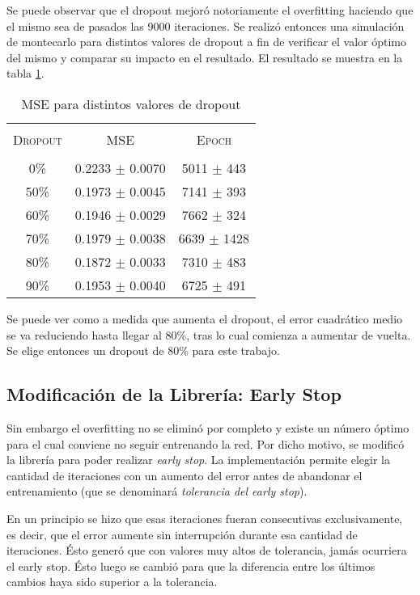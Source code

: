 \documentclass[conference]{IEEEtran}
\theoremstyle{definition}
\begin{document}
Se puede observar que el dropout mejor\'{o} notoriamente el overfitting haciendo que el mismo sea de pasados las 9000 iteraciones. Se realiz\'{o} entonces una simulaci\'{o}n de montecarlo para distintos valores de dropout a fin de verificar el valor \'{o}ptimo del mismo y comparar su impacto en el resultado. El resultado se muestra en la tabla \ref{tab_dropout_montecarlo}.

\begin{table}[h]
	\centering
	\caption{MSE para distintos valores de dropout}
	\label{tab_dropout_montecarlo}
	\begin{tabular}{ c c c }    
		\hline \\ 
		\textsc{Dropout} & \textsc{MSE} & \textsc{Epoch}    \\ 
		\hline 
		\\
		0\%		&  0.2233 \(\pm\) 0.0070 	& 5011 \(\pm\) 443 	\\
		50\% 	&  0.1973 \(\pm\) 0.0045 	& 7141 \(\pm\) 393 	\\
		60\%  	&  0.1946 \(\pm\) 0.0029 	& 7662 \(\pm\) 324	\\
		70\% 	&  0.1979 \(\pm\) 0.0038 	& 6639 \(\pm\) 1428 \\
		80\%  	&  0.1872 \(\pm\) 0.0033 	& 7310 \(\pm\) 483	\\
		90\%  	&  0.1953 \(\pm\) 0.0040 	& 6725 \(\pm\) 491 	\\
		\hline
	\end{tabular}
\end{table}

Se puede ver como a medida que aumenta el dropout, el error cuadr\'{a}tico medio se va reduciendo hasta llegar al 80\%, tras lo cual comienza a aumentar de vuelta. Se elige entonces un dropout de 80\% para este trabajo.

\subsection{Modificaci\'{o}n de la Librer\'{i}a: Early Stop}
Sin embargo el overfitting no se elimin\'{o} por completo y existe un n\'{u}mero \'{o}ptimo para el cual conviene no seguir entrenando la red. Por dicho motivo, se modific\'{o} la librer\'{i}a para poder realizar \textit{early stop}. 
La implementaci\'{o}n permite elegir la cantidad de iteraciones con un aumento del error antes de abandonar el entrenamiento (que se denominar\'{a} \textit{tolerancia del early stop}).  

En un principio se hizo que esas iteraciones fueran consecutivas exclusivamente, es decir, que el error aumente sin interrupci\'{o}n durante esa cantidad de iteraciones. \'{E}sto gener\'{o} que con valores muy altos de tolerancia, jam\'{a}s ocurriera el early stop.
\'{E}sto luego se cambi\'{o} para que la diferencia entre los \'{u}ltimos cambios haya sido superior a la tolerancia. 
\end{document}
